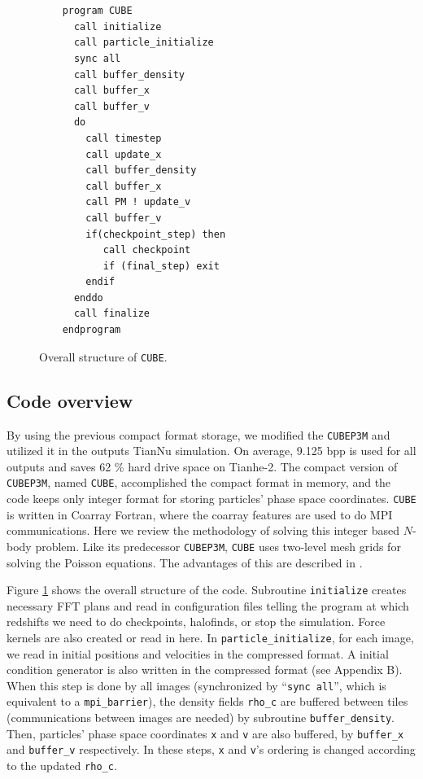 \documentclass[10pt,twocolumn,preprint]{emulateapj}
\begin{document}
\begin{figure}[t]
\begin{verbatim}


    program CUBE
      call initialize
      call particle_initialize
      sync all
      call buffer_density
      call buffer_x
      call buffer_v
      do
        call timestep
        call update_x
        call buffer_density
        call buffer_x
        call PM ! update_v
        call buffer_v
        if(checkpoint_step) then
           call checkpoint
           if (final_step) exit
        endif
      enddo
      call finalize
    endprogram
\end{verbatim}
\caption{Overall structure of {\tt CUBE}.}
\label{fig.code}
\end{figure}

\subsection{Code overview}
By using the previous compact format storage, we modified the {\tt CUBEP3M} and utilized it in the outputs TianNu simulation. On average, 9.125 bpp is used for all outputs and saves 62 \% hard drive space on Tianhe-2. The compact version of {\tt CUBEP3M}, named {\tt CUBE}, accomplished the compact format in memory, and the code keeps only integer format for storing particles' phase space coordinates. {\tt CUBE} is written in Coarray Fortran, where the coarray features are used to do MPI communications. Here we review the methodology of solving this integer based $N$-body problem. Like its predecessor {\tt CUBEP3M}, {\tt CUBE} uses two-level mesh grids for solving the Poisson equations. The advantages of this are described in \cite{2013MNRAS.436..540H}.

Figure \ref{fig.code} shows the overall structure of the code. Subroutine {\tt initialize} creates necessary FFT plans and read in configuration files telling the program at which redshifts we need to do checkpoints, halofinds, or stop the simulation. Force kernels are also created or read in here. In {\tt particle\_initialize}, for each image, we read in initial positions and velocities in the compressed format.  A initial condition generator is also written in the compressed format (see Appendix B). When this step is done by all images (synchronized by ``{\tt sync all}'', which is equivalent to a {\tt mpi\_barrier}), the density fields {\tt rho\_c} are buffered between tiles (communications between images are needed) by subroutine {\tt buffer\_density}. Then, particles' phase space coordinates {\tt x} and {\tt v} are also buffered, by {\tt buffer\_x} and {\tt buffer\_v} respectively. In these steps, {\tt x} and {\tt v}'s ordering is changed according to the updated {\tt rho\_c}.
\end{document}
